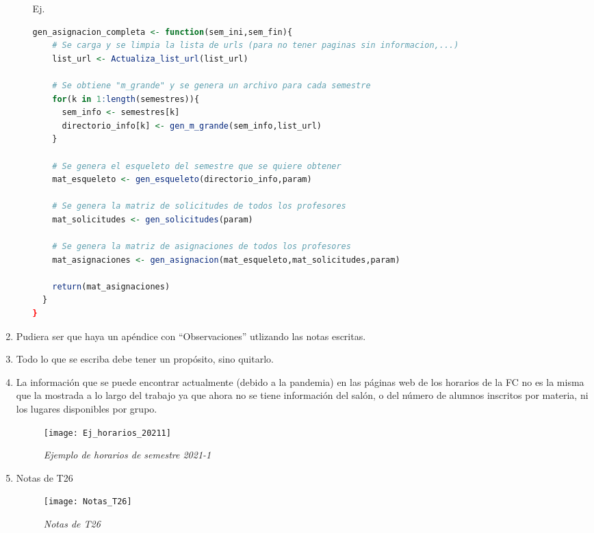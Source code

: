 \begin{enumerate}
\begin{itemize}
  Ej.

  \begin{lstlisting}[language=R, caption= \textit{Ejemplo de estructura de funciones}]
  gen_asignacion_completa <- function(sem_ini,sem_fin){   
    # Se carga y se limpia la lista de urls (para no tener paginas sin informacion,...)
    list_url <- Actualiza_list_url(list_url)
    
    # Se obtiene "m_grande" y se genera un archivo para cada semestre
    for(k in 1:length(semestres)){
      sem_info <- semestres[k]
      directorio_info[k] <- gen_m_grande(sem_info,list_url)
    }
    
    # Se genera el esqueleto del semestre que se quiere obtener
    mat_esqueleto <- gen_esqueleto(directorio_info,param)
        
    # Se genera la matriz de solicitudes de todos los profesores
    mat_solicitudes <- gen_solicitudes(param)
    
    # Se genera la matriz de asignaciones de todos los profesores
    mat_asignaciones <- gen_asignacion(mat_esqueleto,mat_solicitudes,param)
    
    return(mat_asignaciones)
  }
}
  \end{lstlisting}
  \end{itemize}
  
  \item Pudiera ser que haya un apéndice con ``Observaciones'' utlizando las notas escritas.
  
  \item Todo lo que se escriba debe tener un propósito, sino quitarlo.
  
  \item La información que se puede encontrar actualmente (debido a la pandemia) en las páginas web de los horarios de la FC no es la misma que la mostrada a lo largo del trabajo ya que ahora no se tiene información del salón, o del número de alumnos inscritos por materia, ni los lugares disponibles por grupo.
  
\begin{figure}[H]
\centering
\texttt{[image: Ej\_horarios\_20211]} %
\caption{\textit{Ejemplo de horarios de semestre 2021-1}}
\end{figure}
  
  \item Notas de T26
\begin{figure}[H]
\centering
\texttt{[image: Notas\_T26]} %
\caption{\textit{Notas de T26}}
\end{figure}
  

\end{enumerate}
